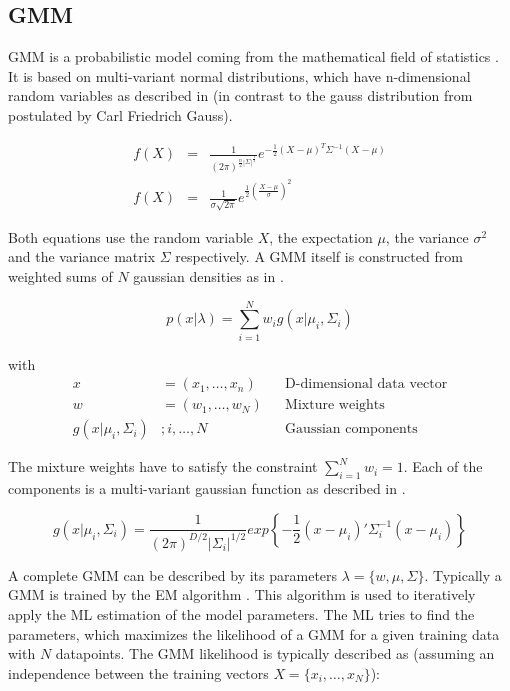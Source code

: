 \subsection{\acf*{GMM}}
\label{sec:gmm}

\acl{GMM} is a probabilistic model coming from the mathematical field of statistics \cite{mclachlan1988mixture}. It is based on multi-variant normal distributions, which have n-dimensional random variables as described in  (in contrast to the gauss distribution from  postulated by Carl Friedrich Gauss).

\begin{eqnarray}
\label{eqn:mulgauss}
f(X) &=& \frac{
1
}{
(2\pi)^{\frac{n}{2} |\Sigma|^{\frac{1}{2}}}
} e ^ { - \frac{1}{2} (X - \mu)^T \Sigma^{-1} (X - \mu) }
\\
\label{eqn:singlegauss}
f(X) &=& \frac{1}{\sigma\sqrt{2\pi}}e^{\frac{1}{2} (\frac{X - \mu}{\sigma})^2}
\end{eqnarray}

Both equations use the random variable $X$, the expectation $\mu$, the variance $\sigma^2$ and the variance matrix $\Sigma$ respectively. A \acl{GMM} itself is constructed from weighted sums of $N$ gaussian densities as in .

\begin{equation}
p(x|\lambda) = \sum_{i=1}^{N} w_i g(x| \mu_i, \Sigma_i)
\label{eqn:gmm}
\end{equation}

with
\begin{align*}
x & = (x_{1},\dotsc,x_{n}) && \text{D-dimensional data vector}\\
w & = (w_1,\dots,w_{N}) && \text{Mixture weights}\\
g(x| \mu_i, \Sigma_i) & ; i,\dots,N && \text{Gaussian components}
\end{align*}

The mixture weights have to satisfy the constraint $\sum_{i=1}^N w_i = 1$. Each of the components is a multi-variant gaussian function as described in .

\begin{equation}
\label{eqn:gauss_func}
g(x|\mu_i, \Sigma_i) = \frac{1}{(2\pi)^{D/2} | \Sigma_i |^{1/2}} exp \left\{ - \frac{1}{2} (x - \mu_i)' \Sigma_i^{-1} (x - \mu_i) \right\}
\end{equation}

A complete \ac{GMM} can be described by its parameters $\lambda = \{w, \mu, \Sigma\}$. Typically a \ac{GMM} is trained by the \acf{EM} algorithm \cite{dempster1977maximum}. This algorithm is used to iteratively apply the \ac{ML} estimation of the model parameters. The \ac{ML} tries to find the parameters, which maximizes the likelihood of a \ac{GMM} for a given training data with $N$ datapoints. The \ac{GMM} likelihood is typically described as (assuming an independence between the training vectors $X = \{x_i,\dots,x_N\}$):

